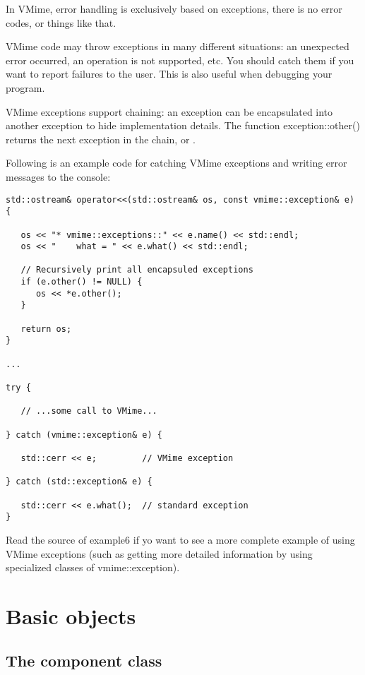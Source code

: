 In VMime, error handling is exclusively based on exceptions, there is no error
codes, or things like that.

VMime code may throw exceptions in many different situations: an unexpected
error occurred, an operation is not supported, etc. You should catch them if
you want to report failures to the user. This is also useful when debugging
your program.

VMime exceptions support chaining: an exception can be encapsulated into
another exception to hide implementation details. The function
{\vcode exception::other()} returns the next exception in the chain,
or \vnull.

Following is an example code for catching VMime exceptions and writing error
messages to the console:

\begin{lstlisting}[caption={Catching VMime exceptions}]
std::ostream& operator<<(std::ostream& os, const vmime::exception& e) {

   os << "* vmime::exceptions::" << e.name() << std::endl;
   os << "    what = " << e.what() << std::endl;

   // Recursively print all encapsuled exceptions
   if (e.other() != NULL) {
      os << *e.other();
   }

   return os;
}

...

try {

   // ...some call to VMime...

} catch (vmime::exception& e) {

   std::cerr << e;         // VMime exception

} catch (std::exception& e) {

   std::cerr << e.what();  // standard exception
}
\end{lstlisting}

Read the source of {\vexample example6} if yo want to see a more complete
example of using VMime exceptions (such as getting more detailed information
by using specialized classes of {\vcode vmime::exception}).


\section{Basic objects}

\subsection{The {\vcode component} class} %

